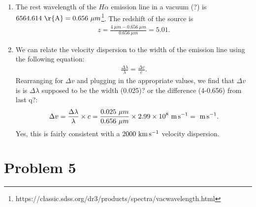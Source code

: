 \documentclass[11pt,letterpaper]{article}
\begin{document}
\begin{enumerate}[label=(\roman*)]
    \item The rest wavelength of the $H\alpha$ emission line in a vacuum (?) is $6564.614~{\rm \r{A}} = 0.656~{\mu m}$\footnote{https://classic.sdss.org/dr3/products/spectra/vacwavelength.html}. The redshift of the source is 
        \begin{align*}
            z = \frac{4~{\mu m} - 0.656~{\mu m}}{0.656~{\mu m}} = 5.01.
        \end{align*}

    \item We can relate the velocity dispersion to the width of the emission line using the following equation:
        \begin{align*}
            \frac{\Delta \lambda}{\lambda} = \frac{\Delta v}{c}.
        \end{align*}
        Rearranging for $\Delta v$ and plugging in the appropriate values, we find that $\Delta v$ is {\huge is $\Delta \lambda$ supposed to be the width (0.025)? or the difference (4-0.656) from last q?}:
        \begin{align*}
            \Delta v = \frac{\Delta \lambda}{\lambda}\times c = \frac{0.025~{\mu m}}{0.656~{\mu m}}\times 2.99\times 10^{8}~{\rm m\,s^{-1}} = ~{\rm m\,s^{-1}}.
        \end{align*}
        Yes, this is fairly consistent with a $2000~{\rm km\,s^{-1}}$ velocity dispersion.
\end{enumerate}

\section*{Problem 5}
\end{document}
